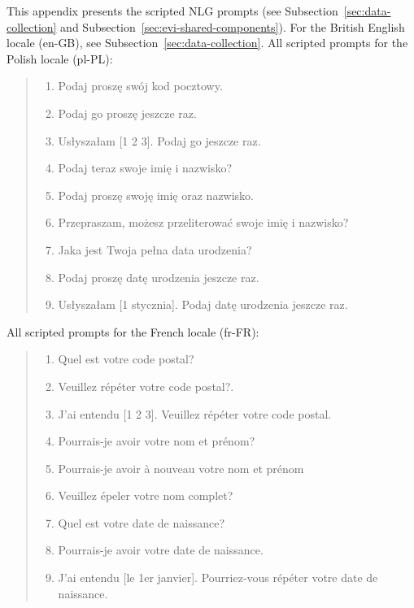 \documentclass[11pt]{article}
\begin{document}
{This appendix
presents the scripted NLG prompts
(see Subsection~\ref{sec:data-collection} and Subsection~\ref{sec:evi-shared-components}).
For the British English locale (en-GB), see Subsection~\ref{sec:data-collection}.
All scripted prompts for the Polish locale (pl-PL):
\begin{quote}
{\small
\begin{enumerate}[label=Q\arabic*:,align=left, leftmargin=15pt]
    \item Podaj proszę swój kod pocztowy.
    \item Podaj go proszę jeszcze raz.
    \item Usłyszałam [1 2 3]. Podaj go jeszcze raz.
    \item Podaj teraz swoje imię i nazwisko?
    \item Podaj proszę swoję imię oraz nazwisko.
    \item Przepraszam, możesz przeliterować swoje imię i nazwisko?
    \item Jaka jest Twoja pełna data urodzenia?
    \item Podaj proszę datę urodzenia jeszcze raz.
    \item Usłyszałam [1 stycznia]. Podaj datę urodzenia jeszcze raz.
\end{enumerate}}
\end{quote}
All scripted prompts for the French locale \!(fr-FR):
\begin{quote}
{\small
\begin{enumerate}[label=Q\arabic*:,align=left, leftmargin=15pt, rightmargin=-10pt]
    \item Quel est votre code postal?
    \item Veuillez répéter votre code postal?.
    \item J'ai entendu [1 2 3]. Veuillez répéter votre code postal.
    \item Pourrais-je avoir votre nom et prénom?
    \item Pourrais-je avoir à nouveau votre nom et prénom
    \item Veuillez épeler votre nom complet?
    \item Quel est votre date de naissance?
    \item Pourrais-je avoir votre date de naissance.
    \item J'ai entendu [le 1er janvier]. Pourriez-vous répéter votre date de naissance.
\end{enumerate}}
\end{quote}



}
\end{document}

